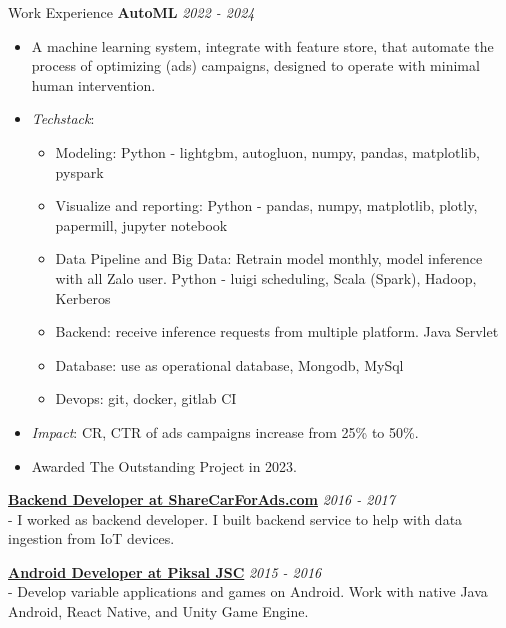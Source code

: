\documentclass{resume} %
\begin{document}
\begin{rSection}{Work Experience}
\textbf{AutoML} \hfill {\em \textit{2022 - 2024}}
\begin{itemize}
    \item A machine learning system, integrate with feature store, that automate the process of optimizing (ads) campaigns, designed to operate with minimal human intervention.
    \item \textit{Techstack}:
    \begin{itemize}
        \item Modeling: Python - lightgbm, autogluon, numpy, pandas, matplotlib, pyspark
        \item Visualize and reporting: Python - pandas, numpy, matplotlib, plotly, papermill, jupyter notebook
        \item Data Pipeline and Big Data: Retrain model monthly,  model inference with all Zalo user. Python - luigi scheduling, Scala (Spark), Hadoop, Kerberos
        \item Backend: receive inference requests from multiple platform. Java Servlet
        \item Database: use as operational database, Mongodb, MySql
        \item Devops: git, docker, gitlab CI
    \end{itemize} 
    \item \textit{Impact}: CR, CTR of ads campaigns increase from 25\% to 50\%. 
    \item Awarded The Outstanding Project in 2023.
\end{itemize}

{\bf \underline{Backend Developer at ShareCarForAds.com}} \hfill {\em 2016 - 2017}\\
- I worked as backend developer. I built backend service to help with data ingestion from IoT devices. 

{\bf \underline{Android Developer at Piksal JSC}} \hfill {\em 2015 - 2016}\\
- Develop variable applications and games on Android. Work with native Java Android, React Native, and Unity Game Engine. 

\end{rSection}
\end{document}
